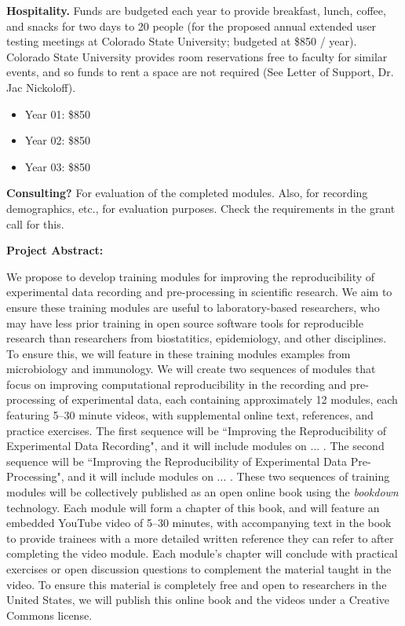 \documentclass[pdftex,english,12pt,parskip=half]{scrartcl}
\begin{document}
\noindent \textbf{Hospitality.} Funds are budgeted each year to provide breakfast, lunch, coffee, and snacks for two days to 20 people (for the proposed annual extended user testing meetings at Colorado State University; budgeted at \$850 / year). Colorado State University provides room reservations free to faculty for similar events, and so funds to rent a space are not required (See Letter of Support, Dr. Jac Nickoloff).
\begin{itemize}
\item Year 01: \$850
\item Year 02: \$850
\item Year 03: \$850
\end{itemize}

\noindent \textbf{Consulting?} For evaluation of the completed modules. Also, for recording demographics, etc., for evaluation purposes. Check the requirements in the grant call for this.

\newpage

{\large \textbf{Project Abstract:}}

We propose to develop training modules for improving the reproducibility of experimental data recording and pre-processing in scientific research. We aim to ensure these training modules are useful to laboratory-based researchers, who may have less prior training in open source software tools for reproducible research than researchers from biostatitics, epidemiology, and other disciplines. To ensure this, we will feature in these training modules examples from microbiology and immunology. We will create two sequences of modules that focus on improving computational reproducibility in the recording and pre-processing of experimental data, each containing approximately 12 modules, each featuring 5--30 minute videos, with supplemental online text, references, and practice exercises. The first sequence will be ``Improving the Reproducibility of Experimental Data Recording", and it will include modules on ... . The second sequence will be ``Improving the Reproducibility of Experimental Data Pre-Processing", and it will include modules on ... . These two sequences of training modules will be collectively published as an open online book using the \textit{bookdown} technology. Each module will form a chapter of this book, and will feature an embedded YouTube video of 5--30 minutes, with accompanying text in the book to provide trainees with a more detailed written reference they can refer to after completing the video module. Each module's chapter will conclude with practical exercises or open discussion questions to complement the material taught in the video. To ensure this material is completely free and open to researchers in the United States, we will publish this online book and the videos under a Creative Commons license.
\end{document}

